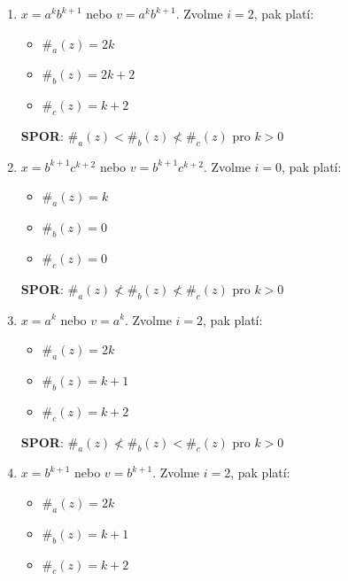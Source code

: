\documentclass[11pt, a4paper]{article}
\begin{document}
\begin{enumerate}
	\setlength\multicolsep{4pt}
	\item $x = a^kb^{k+1}$ nebo $v = a^kb^{k+1}$. Zvolme $i = 2$, pak platí:
	      \begin{multicols}{2}
	      	\begin{itemize}[label={},noitemsep]
	      		\item $\#_a(z) = 2k$
	      		\item $\#_b(z) = 2k + 2$
	      		\item $\#_c(z) = k + 2$
	      	\end{itemize}
	      	\columnbreak
	      	\textbf{SPOR}: $\#_a(z) < \#_b(z) \nless \#_c(z)$ pro $k > 0$
	      \end{multicols}
	\item $x = b^{k+1}c^{k+2}$ nebo $v = b^{k+1}c^{k+2}$. Zvolme $i = 0$, pak platí:
	      \begin{multicols}{2}
	      	\begin{itemize}[label={},noitemsep]
	      		\item $\#_a(z) = k$
	      		\item $\#_b(z) = 0$
	      		\item $\#_c(z) = 0$
	      	\end{itemize}
	      	\columnbreak
	      	\textbf{SPOR}: $\#_a(z) \nless \#_b(z) \nless \#_c(z)$ pro $k > 0$
	      \end{multicols}
	\item $x = a^k$ nebo $v = a^k$. Zvolme $i = 2$, pak platí:
	      \begin{multicols}{2}
	      	\begin{itemize}[label={},noitemsep]
	      		\item $\#_a(z) = 2k$
	      		\item $\#_b(z) = k + 1$
	      		\item $\#_c(z) = k + 2$
	      	\end{itemize}
	      	\columnbreak
	      	\textbf{SPOR}: $\#_a(z) \nless \#_b(z) < \#_c(z)$ pro $k > 0$
	      \end{multicols}
	\item $x = b^{k+1}$ nebo $v = b^{k+1}$. Zvolme $i = 2$, pak platí:
	      \begin{multicols}{2}
	      	\begin{itemize}[label={},noitemsep]
	      		\item $\#_a(z) = 2k$
	      		\item $\#_b(z) = k + 1$
	      		\item $\#_c(z) = k + 2$

\end{itemize}
\end{multicols}
\end{enumerate}
\end{document}
